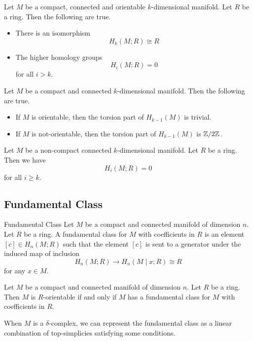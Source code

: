 \documentclass[a4paper]{article}
\begin{document}
\begin{crl}{}{} Let $M$ be a compact, connected and orientable $k$-dimensional manifold. Let $R$ be a ring. Then the following are true. 
\begin{itemize}
\item There is an isomorphism $$H_k(M;R)\cong R$$
\item The higher homology groups $$H_i(M;R)=0$$ for all $i>k$. 
\end{itemize}
\end{crl}

\begin{crl}{}{} Let $M$ be a compact and connected $k$-dimensional manifold. Then the following are true. 
\begin{itemize}
\item If $M$ is orientable, then the torsion part of $H_{k-1}(M)$ is trivial. 
\item If $M$ is not-orientable, then the torsion part of $H_{k-1}(M)$ is $\mathbb{Z}/2\mathbb{Z}$. 
\end{itemize}
\end{crl}

\begin{crl}{}{} Let $M$ be a non-compact connected $k$-dimensional manifold. Let $R$ be a ring. Then we have $$H_i(M;R)=0$$ for all $i\geq k$. 
\end{crl}

\subsection{Fundamental Class}
\begin{defn}{Fundamental Class}{} Let $M$ be a compact and connected manifold of dimension $n$. Let $R$ be a ring. A fundamental class for $M$ with coefficients in $R$ is an element $[c]\in H_n(M;R)$ such that the element $[c]$ is sent to a generator under the induced map of inclusion $$H_n(M;R)\to H_n(M\;|\;x;R)\cong R$$ for any $x\in M$. 
\end{defn}

\begin{lmm}{}{} Let $M$ be a compact and connected manifold of dimension $n$. Let $R$ be a ring. Then $M$ is $R$-orientable if and only if $M$ has a fundamental class for $M$ with coefficients in $R$. 
\end{lmm}

When $M$ is a $\delta$-complex, we can represent the fundamental class as a linear combination of top-simplicies satisfying some conditions. 
\end{document}
